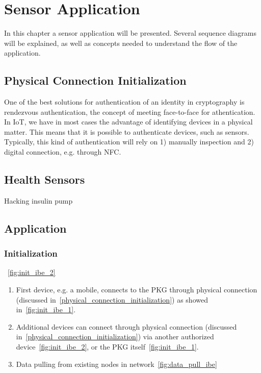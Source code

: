 \chapter{Sensor Application}\label{sensor-application}
In this chapter a sensor application will be presented. 
Several sequence diagrams will be explained, as well as concepts needed to understand the flow of the application. 

\section{Physical Connection Initialization}\label{physical_connection_initialization}
One of the best solutions for authentication of an identity in cryptography is rendezvous authentication, the concept of meeting face-to-face for athentication. 
In \gls{IoT}, we have in most cases the advantage of identifying devices in a physical matter. 
This means that it is possible to authenticate devices, such as sensors. 
Typically, this kind of authentication will rely on 1) manually inspection and 2) digital connection, e.g. through \gls{NFC}.

\section{Health Sensors}
Hacking insulin pump~\cite{radcliffe2011hacking}

\section{Application}


\subsection{Initialization}
~\autoref{fig:init_ibe_2}

\begin{enumerate}
  \item First device, e.g. a mobile, connects to the \gls{PKG} through physical connection (discussed in~\autoref{physical_connection_initialization}) as showed in~\autoref{fig:init_ibe_1}.
  \item Additional devices can connect through physical connection (discussed in~\autoref{physical_connection_initialization}) via another authorized device~\autoref{fig:init_ibe_2}, or the \gls{PKG} itself~\autoref{fig:init_ibe_1}. 
  \item Data pulling from existing nodes in network~\autoref{fig:data_pull_ibe}
\end{enumerate}

